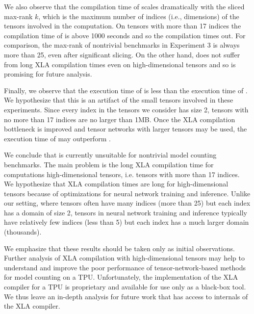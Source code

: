 We also observe that the compilation time of  scales dramatically with the sliced max-rank $k$, which is the maximum number of indices (i.e., dimensions) of the tensors involved in the computation.
On tensors with more than 17 indices the compilation time of  is above 1000 seconds and so the compilation times out.
For comparison, the max-rank of nontrivial benchmarks in Experiment 3 is always more than 25, even after significant slicing.
On the other hand,  does not suffer from long XLA compilation times even on high-dimensional tensors and so is promising for future analysis.

Finally, we observe that the execution time of  is less than the execution time of .
We hypothesize that this is an artifact of the small tensors involved in these experiments. Since every index in the tensors we consider has size 2, tensors with no more than 17 indices are no larger than 1MB.
Once the XLA compilation bottleneck is improved and tensor networks with larger tensors may be used, the execution time of  may outperform .

We conclude that  is currently unsuitable for nontrivial model counting benchmarks. The main problem is the long XLA compilation time for computations high-dimensional tensors, i.e. tensors with more than 17 indices.
We hypothesize that XLA compilation times are long for high-dimensional tensors because of optimizations for neural network training and inference. 
Unlike our setting, where tensors often have many indices (more than 25) but each index has a domain of size 2, tensors in neural network training and inference typically have relatively few indices (less than 5) but each index has a much larger domain (thousands). %

We emphasize that these results should be taken only as initial observations.
Further analysis of XLA compilation with high-dimensional tensors may help to understand and improve the poor performance of tensor-network-based methods for model counting on a TPU.
Unfortunately, the implementation of the XLA compiler for a TPU is proprietary and available for use only as a black-box tool. 
We thus leave an in-depth analysis for future work that has access to internals of the XLA compiler.
